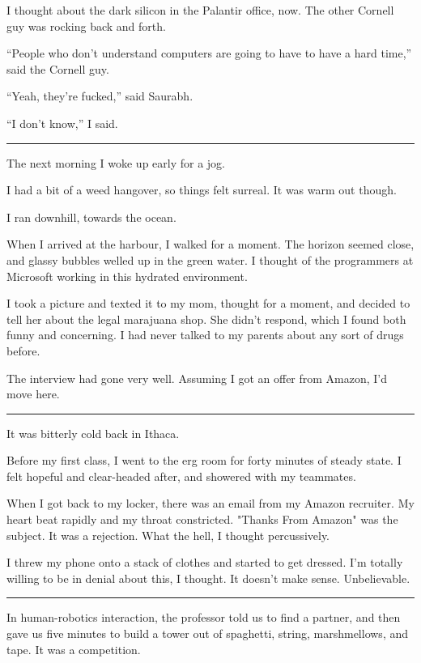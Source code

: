 I thought about the dark silicon in the Palantir office, now.  The other Cornell
guy was rocking back and forth.

``People who don't understand computers are going to have to have a hard time,''
said the Cornell guy.

``Yeah, they're fucked,'' said Saurabh.

``I don't know,'' I said.

\plainfancybreak{12pt}{2}{* * *}

The next morning I woke up early for a jog.

I had a bit of a weed hangover, so things felt surreal.  It was warm out though.

I ran downhill, towards the ocean.

When I arrived at the harbour, I walked for a moment.  The horizon seemed close,
and glassy bubbles welled up in the green water.  I thought of the programmers
at Microsoft working in this hydrated environment. 

I took a picture and texted it to my mom, thought for a moment, and decided to
tell her about the legal marajuana shop.  She didn't respond, which I found both
funny and concerning.  I had never talked to my parents about any sort of drugs
before. 

The interview had gone very well.  Assuming I got an offer from Amazon, I'd move
here. 

\plainfancybreak{12pt}{2}{* * *}

It was bitterly cold back in Ithaca.

Before my first class, I went to the erg room for forty minutes of steady state.
I felt hopeful and clear-headed after, and showered with my teammates.

When I got back to my locker, there was an email from my Amazon recruiter.  My
heart beat rapidly and my throat constricted.  "Thanks From Amazon" was the
subject.  It was a rejection.  What the hell, I thought percussively. 

I threw my phone onto a stack of clothes and started to get dressed.  I'm
totally willing to be in denial about this, I thought.  It doesn't make sense.
Unbelievable. 

\plainfancybreak{12pt}{2}{* * *}

In human-robotics interaction, the professor told us to find a partner, and then
gave us five minutes to build a tower out of spaghetti, string, marshmellows,
and tape.  It was a competition.

